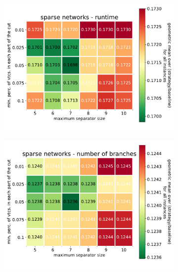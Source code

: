 \documentclass[12pt,a4paper,twoside]{scrartcl}
\numberwithin{equation}{section}
\begin{document}
\begin{figure}[htb!]
	\centering	
	\begin{subfigure}{0.475\textwidth}
		\includegraphics[width=\textwidth]{images/plots/st_tune_sn_t}
	\end{subfigure}
	\begin{subfigure}{0.475\textwidth}
		\includegraphics[width=\textwidth]{images/plots/st_tune_sn_b}
	\end{subfigure}
	\begin{subfigure}{0.475\textwidth}

\end{subfigure}
\end{figure}
\end{document}
